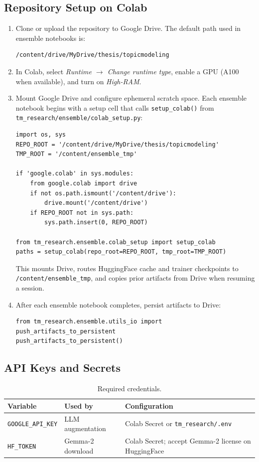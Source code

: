 \documentclass[11pt,a4paper]{article}
\newcommand{\repo}[1]{\texttt{#1}}
\begin{document}
\subsection{Repository Setup on Colab}

\begin{enumerate}[label=\arabic*.]
  \item Clone or upload the repository to Google Drive. The default path used in ensemble notebooks is:
  \begin{lstlisting}
/content/drive/MyDrive/thesis/topicmodeling
  \end{lstlisting}
  \item In Colab, select \emph{Runtime $\rightarrow$ Change runtime type}, enable a GPU (A100 when available), and turn on \emph{High-RAM}.
  \item Mount Google Drive and configure ephemeral scratch space. Each ensemble notebook begins with a setup cell that calls \repo{setup\_colab()} from \repo{tm\_research/ensemble/colab\_setup.py}:
  \begin{lstlisting}
import os, sys
REPO_ROOT = '/content/drive/MyDrive/thesis/topicmodeling'
TMP_ROOT = '/content/ensemble_tmp'

if 'google.colab' in sys.modules:
    from google.colab import drive
    if not os.path.ismount('/content/drive'):
        drive.mount('/content/drive')
    if REPO_ROOT not in sys.path:
        sys.path.insert(0, REPO_ROOT)

from tm_research.ensemble.colab_setup import setup_colab
paths = setup_colab(repo_root=REPO_ROOT, tmp_root=TMP_ROOT)
  \end{lstlisting}
  This mounts Drive, routes HuggingFace cache and trainer checkpoints to \repo{/content/ensemble\_tmp}, and copies prior artifacts from Drive when resuming a session.
  \item After each ensemble notebook completes, persist artifacts to Drive:
  \begin{lstlisting}
from tm_research.ensemble.utils_io import push_artifacts_to_persistent
push_artifacts_to_persistent()
  \end{lstlisting}
\end{enumerate}

\subsection{API Keys and Secrets}

\begin{table}[htbp]
  \centering
  \caption{Required credentials.}
  \label{tab:secrets}
  \begin{tabular}{@{}lll@{}}
    \toprule
    Variable & Used by & Configuration \\
    \midrule
    \texttt{GOOGLE\_API\_KEY} & LLM augmentation & Colab Secret or \repo{tm\_research/.env} \\
    \texttt{HF\_TOKEN} & Gemma-2 download & Colab Secret; accept Gemma-2 license on HuggingFace \\
    \bottomrule
  \end{tabular}
\end{table}
\end{document}
